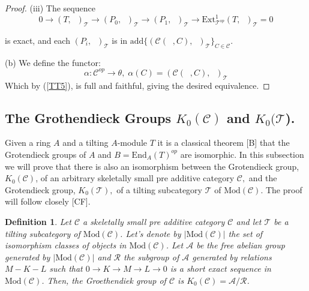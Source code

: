 \documentclass{amsart}
\theoremstyle{plain}
\newtheorem{definition}{Definition}
\numberwithin{equation}{section}
\begin{document}
\begin{proof}
(iii) The sequence
\begin{equation*}
0\rightarrow (T,\;\;)_{\mathcal{T}}\rightarrow (P_{0},\;\;)_{\mathcal{T}}\rightarrow (P_{1},\;\;)_{\mathcal{T}}\rightarrow \mathrm{Ext}_{\mathcal{T}^{op}}^{1}(T,\;\;)_{\mathcal{T}}=0
\end{equation*}

is exact, and each $(P_{i},\;\;)_{\mathcal{T}}$ is in $\mathrm{add}\{(\mathcal{C}(\;\;,C),\;\;)_{\mathcal{T}}\}_{C\in \mathcal{C}}$.

(b) We define the functor:
\begin{equation*}
\alpha :\mathcal{C}^{op}\rightarrow \theta,\;\alpha (C)=(\mathcal{C}(\;\;,C),\;\;)_\mathcal{T}
\end{equation*}Which by (\ref{TT5}), is full and faithful, giving the desired equivalence.
\end{proof}

\subsection{ The Grothendieck Groups $K_{0}(\mathcal{C})$ and $K_{0}(\mathcal{T}$).}

Given a ring $A$ and a tilting $A$-module $T$ it is a classical theorem [B]
that the Grotendieck groups of $A$ and $B=\mathrm{End}_{A}(T)^{op}$ are
isomorphic. In this subsection we will prove that there is also an
isomorphism between the Grotendieck group, $K_{0}(\mathcal{C})$, of an
arbitrary skeletally small pre additive category $\mathcal{C},$ and the
Grotendieck group, $K_{0}(\mathcal{T}),$ of a tilting subcategory $\mathcal{T}$ of $\mathrm{\mathrm{Mod}}(\mathcal{C})$. The proof will follow closely
[CF].

\begin{definition}
Let $\mathcal{C}$ a skeletally small pre additive category $\mathcal{C}$ and
let $\mathcal{T}$ be a tilting subcategory of $\mathrm{\mathrm{Mod}}(\mathcal{C})$. Let's denote by $|\mathrm{\mathrm{Mod}}(\mathcal{C})|$ the
set of isomorphism classes of objects in $\mathrm{\mathrm{Mod}}(\mathcal{C})$. Let $\mathcal{A}$ be the free abelian group generated by $|\mathrm{\mathrm{Mod}}(\mathcal{C})|$ and $\mathcal{R}$ the subgroup of $\mathcal{A}$
generated by relations $M-K-L$ such that $0\rightarrow K\rightarrow
M\rightarrow L\rightarrow 0$ is a short exact sequence in $\mathrm{\mathrm{Mod}}(\mathcal{C})$. Then, the Groethendiek group of $\mathcal{C}$ is $K_{0}(\mathcal{C})=\mathcal{A}/\mathcal{R}$.
\end{definition}
\end{document}
